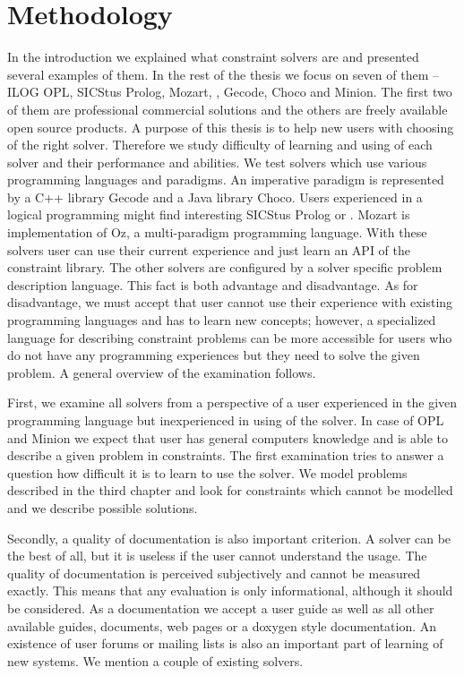 \chapter{Methodology}
\thispagestyle{myheadings}

In the introduction we explained what constraint solvers are and presented several 
examples of them. In the rest of the thesis we focus on seven of them -- ILOG 
OPL, SICStus Prolog, Mozart, \eclipse, Gecode, Choco and Minion. The first two of them are 
professional commercial solutions and the others are freely available open source 
products. A purpose of this thesis is to help new users with choosing of the right solver. 
Therefore we study difficulty of learning and using of each solver and their 
performance and abilities. We test solvers which use various programming languages 
and paradigms. An imperative paradigm is represented by a C++ library Gecode and a Java 
library Choco. Users experienced in a logical programming might find interesting 
SICStus Prolog or \eclipse. Mozart is implementation of Oz, a multi-paradigm 
programming language. With these solvers user can use their current experience and 
just learn an API of the constraint library. The other solvers are configured by 
a solver specific problem description language. This fact is both advantage and disadvantage. 
As for disadvantage, we must accept that user cannot use their experience with 
existing programming languages and has to learn new concepts; however, a specialized 
language for describing constraint problems can be more accessible for users who 
do not have any programming experiences but they need to solve the given problem.
A general overview of the examination follows.

First, we examine all solvers from a perspective of a user experienced in the given 
programming language but inexperienced in using of the solver. In case of OPL 
and Minion we expect that user has general computers knowledge and is able 
to describe a given problem in constraints. The first examination tries to answer 
a question how difficult it is to learn to use the solver. We model problems 
described in the third chapter and look for constraints which cannot be modelled 
and we describe possible solutions. 

Secondly, a quality of documentation is also important criterion. A solver can be 
the best of all, but it is useless if the user cannot understand the usage. 
The quality of documentation is perceived subjectively and cannot be measured 
exactly. This means that any evaluation is only informational, although it should be 
considered. As a documentation we accept a user guide as well as all other available 
guides, documents, web pages or a doxygen style documentation. An existence of user 
forums or mailing lists is also an important part of learning of new systems. We 
mention a couple of existing solvers. 

